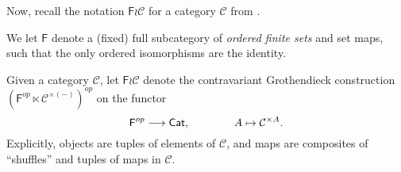 \documentclass[a4paper,10pt
,draft
]{article}%
\renewcommand{\1}{\eta}%
\begin{document}




Now, recall the notation $\mathsf F \wr \mathcal C$ for a category $\mathcal C$ from \cite{BP_geo}.

\begin{notation}
      \label{F_WR_NOT}
      We let $\mathsf F$ denote a (fixed) full subcategory of \textit{ordered finite sets} and set maps,
      such that the only ordered isomorphisms are the identity.
      
      Given a category $\mathcal C$, let $\mathsf F \wr \mathcal C$ denote the contravariant Grothendieck construction
      $(\mathsf F^{op} \ltimes \mathcal C^{\times (-)})^{op}$ on the functor
      \begin{equation}
            \mathsf F^{op} \longrightarrow \mathsf{Cat},
            \qquad \qquad
            A \mapsto \mathcal C^{\times A}.
      \end{equation}
      Explicitly, objects are tuples of elements of $\mathcal C$, and maps are composites of ``shuffles'' and tuples of maps in $\mathcal C$.
\end{notation}
\end{document}
